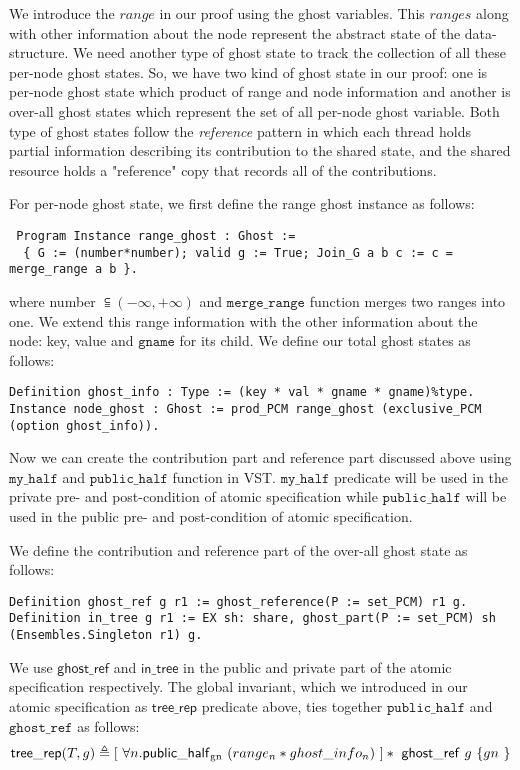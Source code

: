 \documentclass[acmsmall,screen]{acmart}\settopmatter{printfolios=true}
\begin{document}
We introduce the $range$ in our proof using the ghost variables. This $ranges$ along with other information about the node represent the abstract state of the data-structure. We need another type of ghost state to track the collection of all these per-node ghost states. So, we have two kind of ghost state in our proof: one is per-node ghost state which product of range and node information and another is over-all ghost states which represent the set of all per-node ghost variable. Both type of ghost states follow the \emph{reference} pattern in which each thread holds partial information describing its contribution to the shared state, and the shared resource holds a "reference" copy that records all of the contributions.

For per-node ghost state, we first define the range ghost instance as follows:
\begin{verbatim}
 Program Instance range_ghost : Ghost :=
  { G := (number*number); valid g := True; Join_G a b c := c =  merge_range a b }.
\end{verbatim}
where number $\subseteqq (-\infty,+\infty)$ and $\texttt{merge\_range}$ function merges two ranges into one. We extend this range information with the other information about the node: key, value and $\texttt{gname}$ for its child. We define our total ghost states as follows:
\begin{verbatim}
Definition ghost_info : Type := (key * val * gname * gname)%type.
Instance node_ghost : Ghost := prod_PCM range_ghost (exclusive_PCM (option ghost_info)).
\end{verbatim}

Now we can create the contribution part and reference part discussed above using $\texttt{my\_half}$ and $\texttt{public\_half}$ function in VST. $\texttt{my\_half}$ predicate will be used in the private pre- and post-condition of atomic specification while  $\texttt{public\_half}$ will be used in the public pre- and post-condition of atomic specification.

We define the contribution and reference part of the over-all ghost state as follows:
\begin{verbatim}
Definition ghost_ref g r1 := ghost_reference(P := set_PCM) r1 g.
Definition in_tree g r1 := EX sh: share, ghost_part(P := set_PCM) sh (Ensembles.Singleton r1) g.
\end{verbatim}
We use $\mathsf{ghost\_ref}$ and $\mathsf{in\_tree}$ in the public and private part of the atomic specification respectively. The global invariant, which we introduced in our atomic specification as $\mathsf{tree\_rep}$ predicate above, ties together $\texttt{public\_half}$ and $\texttt{ghost\_ref}$ as follows:
\begin{align*}\mathsf{tree\_rep}(T,g) \triangleq [\ \forall n. \mathsf{public\_half\textsubscript{gn}} \ (range_n* ghost\_info_n)\ ] *\ \mathsf{ghost\_ref}\ g\ \{ gn\  \} \end{align*}
\end{document}
